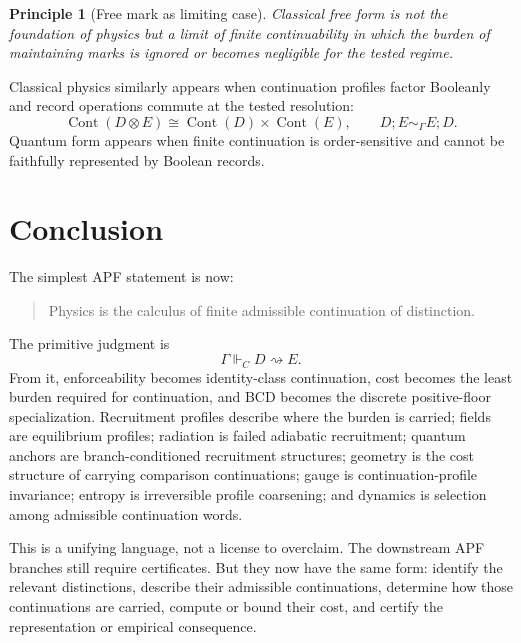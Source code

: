 \documentclass[11pt]{article}
\newtheorem{principle}[theorem]{Principle}
\theoremstyle{remark}
\newcommand{\G}{\Gamma}
\newcommand{\entails}{\Vdash}
\newcommand{\goes}{\rightsquigarrow}
\newcommand{\Cont}{\operatorname{Cont}}
\begin{document}
\begin{principle}[Free mark as limiting case]
Classical free form is not the foundation of physics but a limit of finite continuability in which the burden of maintaining marks is ignored or becomes negligible for the tested regime.
\end{principle}

Classical physics similarly appears when continuation profiles factor Booleanly and record operations commute at the tested resolution:
\[
        \Cont(D\otimes E)\cong \Cont(D)\times\Cont(E),
        \qquad
        D;E\sim_\G E;D.
\]
Quantum form appears when finite continuation is order-sensitive and cannot be faithfully represented by Boolean records.

\section{Conclusion}

The simplest APF statement is now:

\begin{quote}
Physics is the calculus of finite admissible continuation of distinction.
\end{quote}

The primitive judgment is
\[
        \G\entails_C D\goes E.
\]
From it, enforceability becomes identity-class continuation, cost becomes the least burden required for continuation, and BCD becomes the discrete positive-floor specialization.  Recruitment profiles describe where the burden is carried; fields are equilibrium profiles; radiation is failed adiabatic recruitment; quantum anchors are branch-conditioned recruitment structures; geometry is the cost structure of carrying comparison continuations; gauge is continuation-profile invariance; entropy is irreversible profile coarsening; and dynamics is selection among admissible continuation words.

This is a unifying language, not a license to overclaim.  The downstream APF branches still require certificates.  But they now have the same form: identify the relevant distinctions, describe their admissible continuations, determine how those continuations are carried, compute or bound their cost, and certify the representation or empirical consequence.

\begin{center}
\end{center}
\end{document}
